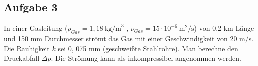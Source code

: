 \documentclass[a4paper,11pt]{article}
\newif\ifshowme
\begin{document}
\ifshowme
\antwort{
\begin{align*}
p_1 + \rho g h_1 + \frac{1}{2}\rho v_1^2 &= p_2 + \rho g h_2 + \frac{1}{2}\rho v_2^2 \\
p_1 + \rho g h_1 + \frac{1}{2}\rho \left( \frac{\dot{V}}{A_1} \right)^2 &= p_2 + \rho g h_2 + \frac{1}{2}\rho \left( \frac{\dot{V}}{A_2} \right)^2 \\
p_1 + \rho g h_1 + \frac{1}{2}\rho \left(\frac{\dot{V}}{A_1}\right)^2 &= p_0  + \rho g D - \rho g D + \frac{1}{2}\rho \left( \frac{\dot{V}}{A_2} \right)^2 \\
p_1 + \rho g h_1 + \frac{1}{2}\rho \left( \frac{\dot{V}}{A_1} \right)^2 &= p_0  + \frac{1}{2}\rho\left(  \frac{\dot{V}}{A_2} \right)^2 \\
\end{align*}
Wir setzen $p_1$ = 0
\begin{align*}
0 + \rho g h_1 + \frac{1}{2}\rho \left( \frac{\dot{V}}{A_1} \right)^2 &= p_0  + \frac{1}{2}\rho \left( \frac{\dot{V}}{A_2} \right)^2 \\
\end{align*} 
Nach Volumenstrom umstellen und einsetzen:
\begin{align*}
\frac{1}{2}\rho \left( \frac{\dot{V}}{A_1} \right)^2 - \frac{1}{2}\rho \left( \frac{\dot{V}}{A_2} \right)^2 &= p_0 - \rho g h\\
\left( \frac{\dot{V}}{A_1} \right)^2 - \left( \frac{\dot{V}}{A_2} \right)^2 &= \frac{p_0 - \rho g h}{\frac{1}{2}\rho}\\
\dot{V} &= \sqrt{\frac{p_0 - \rho g h}{\frac{1}{2} \rho \cdot\left[ \left(\frac{1}{A_1} \right)^2 - \left(\frac{1}{A_2} \right)^2 \right] }} \\
\dot{V} &= \sqrt{\frac{100.000 - 1.000 \cdot 9,81 \cdot 2}{\frac{1}{2} \cdot 1.000 \cdot\left[ \left(\frac{1}{5~\text{m}^2} \right)^2 - \left(\frac{1}{25~\text{m}^2} \right)^2 \right] }}
\end{align*}
\begin{align*}
\dot{V} \geq 64,7 ~\text{m}^3\text{/s}
\end{align*}
}
\else
\fi


\subsection*{Aufgabe 3}
In einer Gasleitung ($\rho_{Gas} = 1, 18 ~\text{kg/m}^3$
, $\nu_{Gas} = 15 \cdot 10^{-6} ~\text{m}^2\text{/s}$) von 0,2 km Länge und
150 mm Durchmesser strömt das Gas mit einer Geschwindigkeit von 20 m/s. Die Rauhigkeit
$k$ sei 0, 075 mm (geschweißte Stahlrohre).
Man berechne den Druckabfall $\Delta p$. Die Strömung kann als inkompressibel angenommen
werden.
\end{document}

